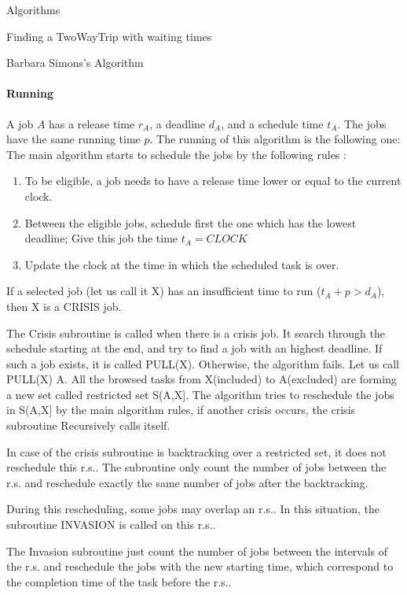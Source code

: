 \documentclass[a4paper,10pt]{report}
\begin{document}
\begin{chapter}{Algorithms}
\begin{section}{Finding a TwoWayTrip with waiting times}
\begin{subsection}{Barbara Simons's Algorithm}
\begin{algorithm}[H]
\begin{algorithmic}
\end{algorithmic}
\end{algorithm}

\paragraph{Running}
A job $A$ has a release time $r_A$, a deadline $d_A$, and a schedule time $t_A$. The jobs have the same running time $p$.
The running of this algorithm is the following one:
The main algorithm starts to schedule the jobs by the following rules :
\begin{enumerate}
 \item To be eligible, a job needs to have a release time lower or equal to the current clock.
 \item Between the eligible jobs, schedule first the one which has the lowest deadline; Give this job the time $t_A = CLOCK$
 \item Update the clock at the time in which the scheduled task is over.
\end{enumerate}

If a selected job (let us call it X) has an insufficient time to run ($t_A + p > d_A$), then X is a CRISIS job.

The Crisis subroutine is called when there is a crisis job. It search through the schedule starting at the end,
and try to find a job with an highest deadline.
If such a job exists, it is called PULL(X). Otherwise, the algorithm fails.
Let us call PULL(X) A.
All the browsed tasks from X(included) to A(excluded) are forming a new set called restricted set S(A,X].
The algorithm tries to reschedule the jobs in S(A,X] by the main algorithm rules, if another crisis occurs, the crisis subroutine Recursively calls
itself.

In case of the crisis subroutine is backtracking over a restricted set, it does not reschedule this r.s.. The subroutine only count
the number of jobs between the r.s. and reschedule exactly the same number of jobs after the backtracking.

During this rescheduling, some jobs may overlap an r.s.. In this situation, the subroutine INVASION is called on this r.s..

The Invasion subroutine just count the number of jobs between the intervals of the r.s. and reschedule the jobs with the new starting time,
which correspond to the completion time of the task before the r.s..




\end{subsection}
\end{section}
\end{chapter}
\end{document}
